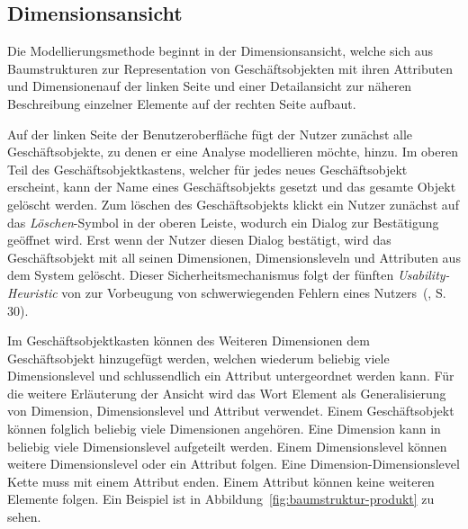 \documentclass[
  language=german, %
  type=bachelor%
]{isthesis}
\begin{document}
\begin{content}
  \subsection{Dimensionsansicht}

  Die Modellierungsmethode beginnt in der Dimensionsansicht, welche sich aus
  Baumstrukturen zur Representation von Geschäftsobjekten mit ihren Attributen
  und Dimensionenauf der linken Seite und einer Detailansicht zur näheren
  Beschreibung einzelner Elemente auf der rechten Seite aufbaut. 

  Auf der linken Seite der Benutzeroberfläche fügt der Nutzer zunächst alle
  Geschäftsobjekte, zu denen er eine Analyse modellieren möchte, hinzu. Im
  oberen Teil des Geschäftsobjektkastens, welcher für jedes neues Geschäftsobjekt erscheint, kann
  der Name eines Geschäftsobjekts gesetzt und das gesamte Objekt gelöscht
  werden. Zum löschen des Geschäftsobjekts klickt ein Nutzer zunächst auf das
  \textit{Löschen}-Symbol in der oberen Leiste, wodurch ein Dialog zur
  Bestätigung geöffnet wird. Erst wenn der Nutzer diesen Dialog bestätigt, wird
  das Geschäftsobjekt mit all seinen Dimensionen, Dimensionsleveln und
  Attributen aus dem System gelöscht. Dieser Sicherheitsmechanismus folgt der
  fünften \textit{Usability-Heuristic} von
  \textsc{\citeauthor{nielsen1994heuristic}} zur Vorbeugung von schwerwiegenden
  Fehlern eines Nutzers~(\citeyear{nielsen1994heuristic}, S. 30).

  Im Geschäftsobjektkasten können des Weiteren Dimensionen dem Geschäftsobjekt
  hinzugefügt werden, welchen wiederum beliebig viele Dimensionslevel und
  schlussendlich ein Attribut untergeordnet werden kann. Für die weitere
  Erläuterung der Ansicht wird das Wort Element als Generalisierung von
  Dimension, Dimensionslevel und Attribut verwendet.  Einem
  Geschäftsobjekt können folglich beliebig viele Dimensionen angehören. Eine
  Dimension kann in beliebig viele Dimensionslevel aufgeteilt werden. Einem
  Dimensionslevel können weitere Dimensionslevel oder ein Attribut folgen. Eine
  Dimension-Dimensionslevel Kette muss mit einem Attribut enden. Einem Attribut
  können keine weiteren Elemente folgen. Ein Beispiel ist in
  Abbildung~\ref{fig:baumstruktur-produkt} zu sehen.

	\begin{figure}[caption={Baumstruktur des Geschäftsobjekts \textit{Produkt}}, label={fig:baumstruktur-produkt}]
		\footnotesize


\end{figure}
\end{content}
\end{document}
